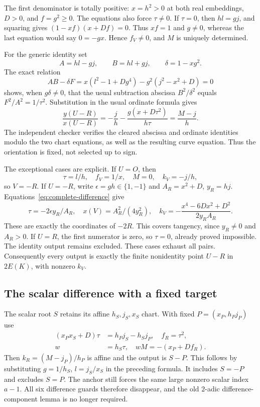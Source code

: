 The first denominator is totally positive: $x=h^2>0$ at both real
embeddings, $D>0$, and $f=g^2\ge0$. The equations also force $\tau\ne0$.
If $\tau=0$, then $hl=gj$, and squaring gives
$(1-xf)(x+Df)=0$. Thus $xf=1$ and $g\ne0$, whereas the last equation
would say $0=-gx$. Hence $f_V\ne0$, and $M$ is uniquely determined.

For the generic identity set
\[
 A=hl-gj,\qquad B=hl+gj,\qquad \delta=1-xg^2.
\]
The exact relation
\[
 AB-\delta F
 =x(l^2-1+Dg^4)-g^2(j^2-x^2+D)=0
\]
shows, when $g\delta\ne0$, that the usual subtraction abscissa
$B^2/\delta^2$ equals $F^2/A^2=1/\tau^2$.
Substitution in the usual ordinate formula gives
\[
 \frac{y(U-R)}{x(U-R)}
 =-\frac jh-\frac{g(x+D\tau^2)}{h\tau}
 =\frac{M-j}{h}.
\]
The independent checker verifies the cleared abscissa and ordinate
identities modulo the two chart equations, as well as the resulting curve
equation. Thus the orientation is fixed, not selected up to sign.

The exceptional cases are explicit. If $U=O$, then
\[
 \tau=l/h,\quad f_V=1/x,\quad M=0,\quad k_V=-j/h,
\]
so $V=-R$. If $U=-R$, write $\epsilon=gh\in\{1,-1\}$ and
$A_R=x^2+D$, $y_R=hj$. Equations~\eqref{eq:complete-difference} give
\[
 \tau=-2\epsilon y_R/A_R,\quad
 x(V)=A_R^2/(4y_R^2),\quad
 k_V=-\frac{x^4-6Dx^2+D^2}{2y_RA_R}.
\]
These are exactly the coordinates of $-2R$. This covers tangency, since
$y_R\ne0$ and $A_R>0$. If $U=R$, the first numerator is zero, so
$\tau=0$, already proved impossible. The identity output remains excluded.
These cases exhaust all pairs. Consequently every output is exactly the
finite nonidentity point $U-R$ in $2E(K)$, with nonzero $k_V$.

\subsection{The scalar difference with a fixed target}
The scalar root $S$ retains its affine $h_S,j_S,x_S$ chart. With fixed
$P=(x_P,h_Pj_P)$ use
\[
 \begin{aligned}
 (x_Px_S+D)\tau&=h_Pj_S-h_Sj_P,\quad f_R=\tau^2,\\
 w&=h_S\tau,\quad wM=-(x_P+Df_R).
 \end{aligned}
\]
Then $k_R=(M-j_P)/h_P$ is affine and the output is $S-P$.
This follows by substituting $g=1/h_S$, $l=j_S/x_S$ in the preceding
formula. It includes $S=-P$ and excludes $S=P$. The anchor still forces
the same large nonzero scalar index $a-1$. All six difference guards
therefore disappear, and the old $2$-adic difference-component lemma
is no longer required.

